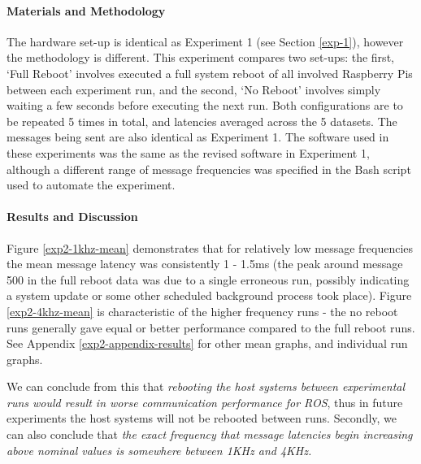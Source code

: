 \documentclass[../dissertation.tex]{subfiles}
\begin{document}
\paragraph{Materials and Methodology} The hardware set-up is identical as Experiment 1 (see Section \ref{exp-1}), however the methodology is different. This experiment compares two set-ups: the first, `Full Reboot' involves executed a full system reboot of all involved Raspberry Pis between each experiment run, and the second, `No Reboot' involves simply waiting a few seconds before executing the next run. Both configurations are to be repeated 5 times in total, and latencies averaged across the 5 datasets. The messages being sent are also identical as Experiment 1. The software used in these experiments was the same as the revised software\cite{Experiment1NoEchoDelayCode} in Experiment 1, although a different range of message frequencies was specified in the Bash script used to automate the experiment.

\paragraph{Results and Discussion} Figure \ref{exp2-1khz-mean} demonstrates that for relatively low message frequencies the mean message latency was consistently 1 - 1.5ms (the peak around message 500 in the full reboot data was due to a single erroneous run, possibly indicating a system update or some other scheduled background process took place). Figure \ref{exp2-4khz-mean} is characteristic of the higher frequency runs - the no reboot runs generally gave equal or better performance compared to the full reboot runs. See Appendix \ref{exp2-appendix-results} for other mean graphs, and individual run graphs.

We can conclude from this that \textit{rebooting the host systems between experimental runs would result in worse communication performance for ROS}, thus in future experiments the host systems will not be rebooted between runs. Secondly, we can also conclude that \textit{the exact frequency that message latencies begin increasing above nominal values is somewhere between 1KHz and 4KHz.}
\end{document}

